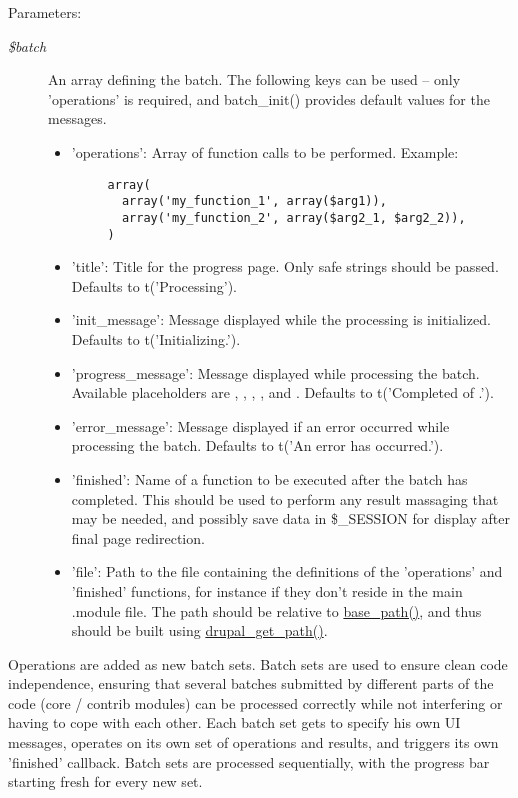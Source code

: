 \begin{Desc}
\item[Parameters:]
\begin{description}
\item[{\em \$batch}]An array defining the batch. The following keys can be used -- only 'operations' is required, and batch\_\-init() provides default values for the messages.\begin{itemize}
\item 'operations': Array of function calls to be performed. Example: 

\begin{Code}\begin{verbatim}     array(
       array('my_function_1', array($arg1)),
       array('my_function_2', array($arg2_1, $arg2_2)),
     )
\end{verbatim}
\end{Code}

\item 'title': Title for the progress page. Only safe strings should be passed. Defaults to t('Processing').\item 'init\_\-message': Message displayed while the processing is initialized. Defaults to t('Initializing.').\item 'progress\_\-message': Message displayed while processing the batch. Available placeholders are , , , ,  and . Defaults to t('Completed  of .').\item 'error\_\-message': Message displayed if an error occurred while processing the batch. Defaults to t('An error has occurred.').\item 'finished': Name of a function to be executed after the batch has completed. This should be used to perform any result massaging that may be needed, and possibly save data in \$\_\-SESSION for display after final page redirection.\item 'file': Path to the file containing the definitions of the 'operations' and 'finished' functions, for instance if they don't reside in the main .module file. The path should be relative to \hyperlink{common_8inc_e227697e9c239f09fd7e36f71afde771}{base\_\-path()}, and thus should be built using \hyperlink{common_8inc_e3bbe8f97bf07bb0eaf4580c98f9bf94}{drupal\_\-get\_\-path()}.\end{itemize}
\end{description}
\end{Desc}
Operations are added as new batch sets. Batch sets are used to ensure clean code independence, ensuring that several batches submitted by different parts of the code (core / contrib modules) can be processed correctly while not interfering or having to cope with each other. Each batch set gets to specify his own UI messages, operates on its own set of operations and results, and triggers its own 'finished' callback. Batch sets are processed sequentially, with the progress bar starting fresh for every new set. 